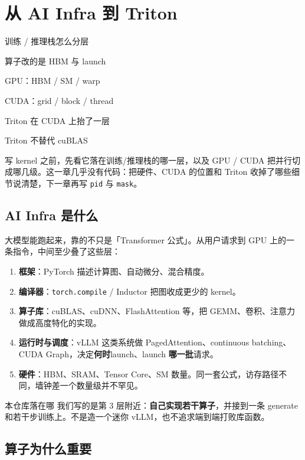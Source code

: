 \chapter{从 AI Infra 到 Triton}

\begin{introduction}
  \item 训练 / 推理栈怎么分层
  \item 算子改的是 HBM 与 launch
  \item GPU：HBM / SM / warp
  \item CUDA：grid / block / thread
  \item Triton 在 CUDA 上抬了一层
  \item Triton 不替代 cuBLAS
\end{introduction}

写 kernel 之前，先看它落在训练/推理栈的哪一层，以及 GPU / CUDA 把并行切成哪几级。这一章几乎没有代码：把硬件、CUDA 的位置和 Triton 收掉了哪些细节说清楚，下一章再写 \texttt{pid} 与 \texttt{mask}。

\section{AI Infra 是什么}

大模型能跑起来，靠的不只是「Transformer 公式」。从用户请求到 GPU 上的一条指令，中间至少叠了这些层：

\begin{enumerate}
  \item \textbf{框架}：PyTorch 描述计算图、自动微分、混合精度。
  \item \textbf{编译器}：\texttt{torch.compile} / Inductor 把图收成更少的 kernel。
  \item \textbf{算子库}：cuBLAS、cuDNN、FlashAttention 等，把 GEMM、卷积、注意力做成高度特化的实现。
  \item \textbf{运行时与调度}：vLLM 这类系统做 PagedAttention、continuous batching、CUDA Graph，决定\textbf{何时}launch、launch \textbf{哪一批}请求。
  \item \textbf{硬件}：HBM、SRAM、Tensor Core、SM 数量。同一套公式，访存路径不同，墙钟差一个数量级并不罕见。
\end{enumerate}

\begin{proposition}{本仓库落在哪}
我们写的是第 3 层附近：\textbf{自己实现若干算子}，并接到一条 generate 和若干步训练上。不是造一个迷你 vLLM，也不追求端到端打败库函数。
\end{proposition}

\section{算子为什么重要}

